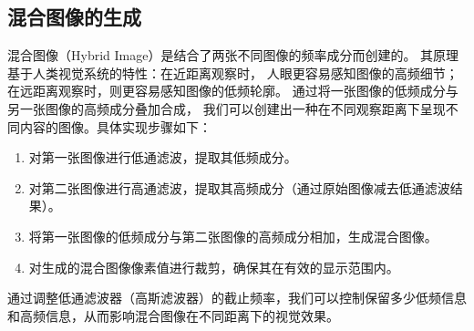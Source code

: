 \subsection{混合图像的生成}
混合图像（Hybrid Image）是结合了两张不同图像的频率成分而创建的。
其原理基于人类视觉系统的特性：在近距离观察时，
人眼更容易感知图像的高频细节；
在远距离观察时，则更容易感知图像的低频轮廓。
通过将一张图像的低频成分与另一张图像的高频成分叠加合成，
我们可以创建出一种在不同观察距离下呈现不同内容的图像。具体实现步骤如下：
\begin{enumerate}
    \item 对第一张图像进行低通滤波，提取其低频成分。
    \item 对第二张图像进行高通滤波，提取其高频成分（通过原始图像减去低通滤波结果）。
    \item 将第一张图像的低频成分与第二张图像的高频成分相加，生成混合图像。
    \item 对生成的混合图像像素值进行裁剪，确保其在有效的显示范围内。
\end{enumerate}

通过调整低通滤波器（高斯滤波器）的截止频率，我们可以控制保留多少低频信息和高频信息，从而影响混合图像在不同距离下的视觉效果。
